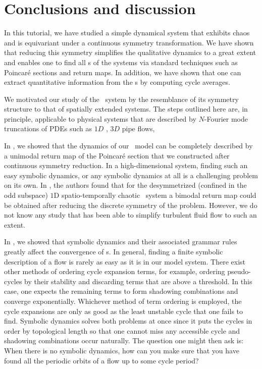 \section{Conclusions and discussion}
\label{s:concl}

In this tutorial, we have studied a simple dynamical 
system that exhibits chaos and is equivariant under a continuous 
symmetry transformation. We have shown that reducing this symmetry 
simplifies the qualitative dynamics to a great extent and enables 
one to find all \rpo s of the systems via standard techniques such 
as Poincar\'e sections and return maps. In addition, we have shown 
that one can extract quantitative information from the \rpo s by 
computing cycle averages.

We motivated our study of the \twomode\ system by the resemblance of its
symmetry structure to that of spatially extended systems. The
steps outlined here are, in principle, applicable to physical systems
that are described by $N$-Fourier mode truncations of PDEs such as $1D$
\KS, $3D$ pipe flows, \etc

In , we showed that the dynamics of our \twomode\ model 
can be completely described by a unimodal return map of the Poincar\'e 
section that we constructed after continuous symmetry reduction. In a 
high-dimensional system, finding such an easy symbolic dynamics, 
or any symbolic dynamics at all is a challenging problem on its 
own. In , the authors found that for 
the desymmetrized (confined in the odd subspace) $1$D 
spatio-temporally chaotic \KS\ system a bimodal return map could 
be obtained after reducing the discrete symmetry of the 
problem. However, we do not know any study that has been able to 
simplify turbulent fluid flow to such an extent.

In , we showed that symbolic dynamics and their
associated grammar rules greatly affect the convergence of \cycForm s.
In general, finding a finite symbolic description of a flow is
rarely as easy as it is in our model system.
There exist other methods of ordering cycle
expansion terms, for example, ordering pseudo-cycles by their stability and discarding terms
that are above a threshold. In this case, one expects the remaining terms to form
shadowing combinations and converge exponentially.
Whichever method of term ordering is employed, the cycle expansions are only as good
as the least unstable cycle that one fails to find. Symbolic dynamics solves both 
problems at once since it puts the cycles in order by topological length so that
one cannot miss any accessible cycle and shadowing combinations occur naturally. 
The question one might then ask is: When there is no symbolic dynamics, how can you make 
sure that you have found all the periodic orbits of a flow up to some cycle period?


